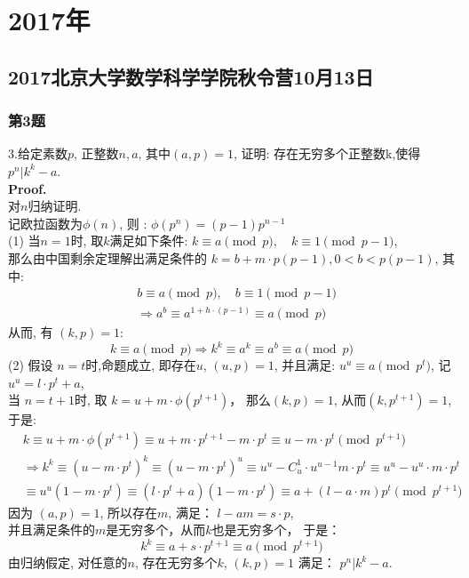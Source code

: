 \documentclass[UTF8]{article}
\begin{document}
\section{2017年}

\subsection{2017北京大学数学科学学院秋令营10月13日}
\subsubsection{第3题}
\noindent 3.给定素数$p$, 正整数$n,a$, 其中$(a,p)=1$, 证明: 存在无穷多个正整数k,使得 $p^n|k^k-a$.\\
\textbf{Proof.}\\
对$n$归纳证明. \\
记欧拉函数为$\phi (n)$, 则 : $\phi (p^n) = (p-1)p^{n-1}$ \\
(1) 当$n=1$时, 取$k$满足如下条件: $k \equiv a \pmod p ,\quad	k \equiv 1 \pmod {p-1}$, \\
那么由中国剩余定理解出满足条件的 $k = b + m\cdot p(p-1) , 0<b < p(p-1)$, 其中: 
\begin{eqnarray*}
&	b \equiv a \pmod p ,\quad	b \equiv 1 \pmod {p-1} \\
&	\Longrightarrow a^b \equiv a^{1+h\cdot (p-1)} \equiv a \pmod p
\end{eqnarray*}
从而, 有 $(k,p)=1$:
$$k \equiv a \pmod p \Longrightarrow k^k \equiv a^k \equiv a^b \equiv a \pmod p$$ 
(2) 假设 $n=t$时,命题成立, 即存在$u$, $(u,p)=1$, 并且满足: $u^u \equiv a \pmod {p^t}$, 记 $u^u = l\cdot p^t + a$,\\
当 $n=t+1$时, 取 $k=u + m\cdot \phi (p^{t+1})$， 那么$(k,p)=1$, 从而$(k,p^{t+1}) =1$, 于是: 
\begin{eqnarray*}
	& k \equiv u+m\cdot \phi(p^{t+1}) \equiv u + m\cdot p^{t+1} - m\cdot p^t \equiv u-m\cdot p^t \pmod{p^{t+1}}\\
	&\Longrightarrow  k^k \equiv (u-m\cdot p^t)^k \equiv (u-m\cdot p^t)^u \equiv u^u -C_u^1\cdot u^{u-1} m\cdot p^t \equiv u^u - u^u\cdot m\cdot p^t \\
	& \equiv u^u(1-m\cdot p^t) \equiv (l\cdot p^t +a)(1-m\cdot p^t) \equiv a + (l-a\cdot m)p^t \pmod{p^{t+1}}
\end{eqnarray*}
因为 $(a,p)=1$, 所以存在$m$, 满足： $l-am=s\cdot p$, \\
并且满足条件的$m$是无穷多个，从而$k$也是无穷多个， 于是：
$$ k^k \equiv a + s\cdot p^{t+1} \equiv a \pmod {p^{t+1}}$$
由归纳假定, 对任意的$n$, 存在无穷多个$k$, $(k,p)=1$ 满足： $p^n|k^k-a$.
\end{document}
